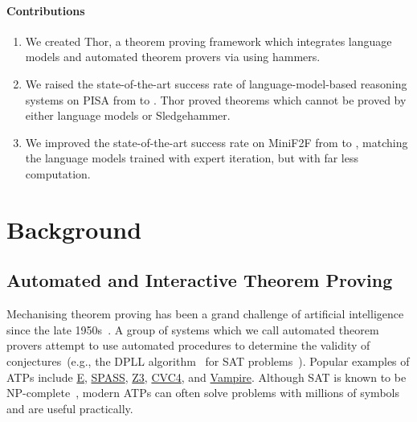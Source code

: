 \documentclass{article}
\begin{document}
\paragraph{Contributions}
\begin{enumerate}
    \item We created Thor, a theorem proving framework which integrates language models and automated theorem provers via using hammers.
    \item We raised the state-of-the-art success rate of language-model-based reasoning systems on PISA from  to . Thor proved  theorems which cannot be proved by either language models or Sledgehammer.
    \item We improved the state-of-the-art success rate on MiniF2F from  to , matching the language models trained with expert iteration, but with far less computation.
\end{enumerate} \section{Background}
\label{sec: back}

\subsection{Automated and Interactive Theorem Proving}
\label{subsec: aitp}
Mechanising theorem proving has been a grand challenge of artificial intelligence since the late 1950s~\citep{gelernter1959realization}.
A group of systems which we call automated theorem provers attempt to use automated procedures to determine the validity of conjectures~(e.g., the DPLL algorithm~\citep{davis1962machine} for SAT problems~\citep{tarski1969truth}). Popular examples of ATPs include \href{https://wwwlehre.dhbw-stuttgart.de/~sschulz/E/E.html}{E}, \href{http://www.spass-prover.org}{SPASS}, \href{https://github.com/Z3Prover/z3}{Z3}, \href{https://cvc4.github.io}{CVC4}, and \href{https://vprover.github.io}{Vampire}. Although SAT is known to be NP-complete~\citep{cook1971complexity}, modern ATPs can often solve problems with millions of symbols~\citep{ohrimenko2009propagation} and are useful practically.
\end{document}

